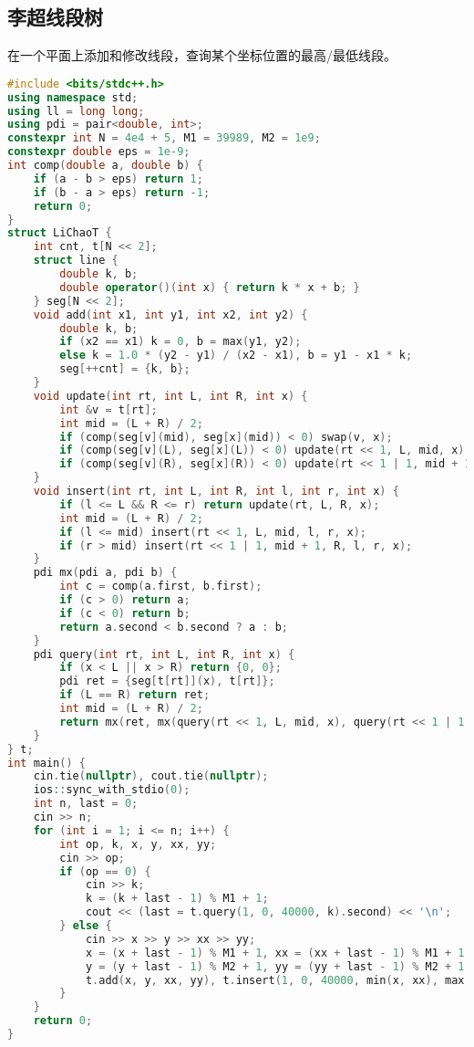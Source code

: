 \documentclass[9pt, a4paper, oneside]{book}
\begin{document}
\subsection{李超线段树}
在一个平面上添加和修改线段，查询某个坐标位置的最高/最低线段。
\begin{lstlisting}[language={C++}]
#include <bits/stdc++.h>
using namespace std;
using ll = long long;
using pdi = pair<double, int>;
constexpr int N = 4e4 + 5, M1 = 39989, M2 = 1e9;
constexpr double eps = 1e-9;
int comp(double a, double b) {
    if (a - b > eps) return 1;
    if (b - a > eps) return -1;
    return 0;
}
struct LiChaoT {
    int cnt, t[N << 2];
    struct line {
        double k, b;
        double operator()(int x) { return k * x + b; }
    } seg[N << 2];
    void add(int x1, int y1, int x2, int y2) {
        double k, b;
        if (x2 == x1) k = 0, b = max(y1, y2);
        else k = 1.0 * (y2 - y1) / (x2 - x1), b = y1 - x1 * k;
        seg[++cnt] = {k, b};
    }
    void update(int rt, int L, int R, int x) {
        int &v = t[rt];
        int mid = (L + R) / 2;
        if (comp(seg[v](mid), seg[x](mid)) < 0) swap(v, x);
        if (comp(seg[v](L), seg[x](L)) < 0) update(rt << 1, L, mid, x);
        if (comp(seg[v](R), seg[x](R)) < 0) update(rt << 1 | 1, mid + 1, R, x);
    }
    void insert(int rt, int L, int R, int l, int r, int x) {
        if (l <= L && R <= r) return update(rt, L, R, x);
        int mid = (L + R) / 2;
        if (l <= mid) insert(rt << 1, L, mid, l, r, x);
        if (r > mid) insert(rt << 1 | 1, mid + 1, R, l, r, x);
    }
    pdi mx(pdi a, pdi b) {
        int c = comp(a.first, b.first);
        if (c > 0) return a;
        if (c < 0) return b;
        return a.second < b.second ? a : b;
    }
    pdi query(int rt, int L, int R, int x) {
        if (x < L || x > R) return {0, 0};
        pdi ret = {seg[t[rt]](x), t[rt]};
        if (L == R) return ret;
        int mid = (L + R) / 2;
        return mx(ret, mx(query(rt << 1, L, mid, x), query(rt << 1 | 1, mid + 1, R, x)));
    }
} t;
int main() {
    cin.tie(nullptr), cout.tie(nullptr);
    ios::sync_with_stdio(0);
    int n, last = 0;
    cin >> n;
    for (int i = 1; i <= n; i++) {
        int op, k, x, y, xx, yy;
        cin >> op;
        if (op == 0) {
            cin >> k;
            k = (k + last - 1) % M1 + 1;
            cout << (last = t.query(1, 0, 40000, k).second) << '\n';
        } else {
            cin >> x >> y >> xx >> yy;
            x = (x + last - 1) % M1 + 1, xx = (xx + last - 1) % M1 + 1;
            y = (y + last - 1) % M2 + 1, yy = (yy + last - 1) % M2 + 1;
            t.add(x, y, xx, yy), t.insert(1, 0, 40000, min(x, xx), max(x, xx), t.cnt);
        }
    }
    return 0;
}\end{lstlisting}
\end{document}
